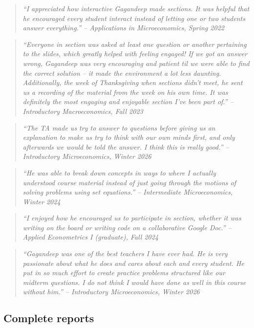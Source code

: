 \documentclass[letter,11pt]{article}
\begin{document}
\begin{quote}\itshape ``I appreciated how interactive Gagandeep made sections. It was helpful that he encouraged every student interact instead of letting one or two students answer everything.'' \normalfont -- Applications in Microeconomics, Spring 2022\end{quote}
\begin{quote}\itshape ``Everyone in section was asked at least one question or another pertaining to the slides, which greatly helped with feeling engaged! If we got an answer wrong, Gagandeep was very encouraging and patient til we were able to find the correct solution -- it made the environment a lot less daunting. Additionally, the week of Thanksgiving when sections didn't meet, he sent us a recording of the material from the week on his own time. It was definitely the most engaging and enjoyable section I've been part of.'' \normalfont -- Introductory Macroeconomics, Fall 2023\end{quote}
\begin{quote}\itshape ``The TA made us try to answer to questions before giving us an explanation to make us try to think with our own minds first, and only afterwards we would be told the answer. I think this is really good.'' \normalfont -- Introductory Microeconomics, Winter 2026\end{quote}
\begin{quote}\itshape ``He was able to break down concepts in ways to where I actually understood course material instead of just going through the motions of solving problems using set equations.'' \normalfont -- Intermediate Microeconomics, Winter 2024\end{quote}
\begin{quote}\itshape ``I enjoyed how he encouraged us to participate in section, whether it was writing on the board or writing code on a collaborative Google Doc.'' \normalfont -- Applied Econometrics I (graduate), Fall 2024\end{quote}
\begin{quote}\itshape ``Gagandeep was one of the best teachers I have ever had. He is very passionate about what he does and cares about each and every student. He put in so much effort to create practice problems structured like our midterm questions. I do not think I would have done as well in this course without him.'' \normalfont -- Introductory Microeconomics, Winter 2026\end{quote}

\subsection*{Complete reports}
\end{document}
